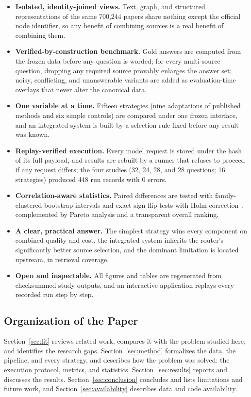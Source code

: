 \documentclass[conference]{IEEEtran}
\begin{document}
\begin{itemize}
\item \textbf{Isolated, identity-joined views.} Text, graph, and structured representations of the same 700,244 papers share nothing except the official node identifier, so any benefit of combining sources is a real benefit of combining them.
\item \textbf{Verified-by-construction benchmark.} Gold answers are computed from the frozen data before any question is worded; for every multi-source question, dropping any required source provably enlarges the answer set; noisy, conflicting, and unanswerable variants are added as evaluation-time overlays that never alter the canonical data.
\item \textbf{One variable at a time.} Fifteen strategies (nine adaptations of published methods and six simple controls) are compared under one frozen interface, and an integrated system is built by a selection rule fixed before any result was known.
\item \textbf{Replay-verified execution.} Every model request is stored under the hash of its full payload, and results are rebuilt by a runner that refuses to proceed if any request differs; the four studies (32, 24, 28, and 28 questions; 16 strategies) produced 448 run records with 0 errors.
\item \textbf{Correlation-aware statistics.} Paired differences are tested with family-clustered bootstrap intervals and exact sign-flip tests with Holm correction~\cite{holm1979,efron1993,cameron2008}, complemented by Pareto analysis and a transparent overall ranking.
\item \textbf{A clear, practical answer.} The simplest strategy wins every component on combined quality and cost, the integrated system inherits the router's significantly better source selection, and the dominant limitation is located upstream, in retrieval coverage.
\item \textbf{Open and inspectable.} All figures and tables are regenerated from checksummed study outputs, and an interactive application replays every recorded run step by step.
\end{itemize}

\subsection{Organization of the Paper}

Section~\ref{sec:lit} reviews related work, compares it with the problem studied here, and identifies the research gaps. Section~\ref{sec:method} formalizes the data, the pipeline, and every strategy, and describes how the problem was solved: the execution protocol, metrics, and statistics. Section~\ref{sec:results} reports and discusses the results. Section~\ref{sec:conclusion} concludes and lists limitations and future work, and Section~\ref{sec:availability} describes data and code availability.
\end{document}
